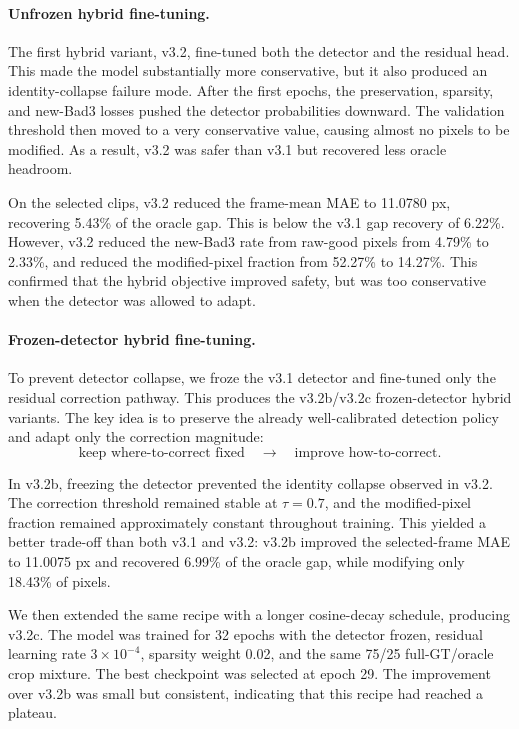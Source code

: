 \documentclass[11pt,a4paper]{article}
\begin{document}
\paragraph{Unfrozen hybrid fine-tuning.}
The first hybrid variant, v3.2, fine-tuned both the detector and the residual
head. This made the model substantially more conservative, but it also produced
an identity-collapse failure mode. After the first epochs, the preservation,
sparsity, and new-Bad3 losses pushed the detector probabilities downward. The
validation threshold then moved to a very conservative value, causing almost no
pixels to be modified. As a result, v3.2 was safer than v3.1 but recovered less
oracle headroom.

On the selected clips, v3.2 reduced the frame-mean MAE to 11.0780 px, recovering
5.43\% of the oracle gap. This is below the v3.1 gap recovery of 6.22\%.
However, v3.2 reduced the new-Bad3 rate from raw-good pixels from 4.79\% to
2.33\%, and reduced the modified-pixel fraction from 52.27\% to 14.27\%. This
confirmed that the hybrid objective improved safety, but was too conservative
when the detector was allowed to adapt.

\paragraph{Frozen-detector hybrid fine-tuning.}
To prevent detector collapse, we froze the v3.1 detector and fine-tuned only the
residual correction pathway. This produces the v3.2b/v3.2c frozen-detector hybrid
variants. The key idea is to preserve the already well-calibrated detection
policy and adapt only the correction magnitude:
\[
\text{keep where-to-correct fixed}
\quad \rightarrow \quad
\text{improve how-to-correct}.
\]

In v3.2b, freezing the detector prevented the identity collapse observed in v3.2.
The correction threshold remained stable at \(\tau=0.7\), and the modified-pixel
fraction remained approximately constant throughout training. This yielded a
better trade-off than both v3.1 and v3.2: v3.2b improved the selected-frame MAE
to 11.0075 px and recovered 6.99\% of the oracle gap, while modifying only
18.43\% of pixels.

We then extended the same recipe with a longer cosine-decay schedule, producing
v3.2c. The model was trained for 32 epochs with the detector frozen, residual
learning rate \(3\times10^{-4}\), sparsity weight 0.02, and the same 75/25
full-GT/oracle crop mixture. The best checkpoint was selected at epoch 29.
The improvement over v3.2b was small but consistent, indicating that this recipe
had reached a plateau.
\end{document}
